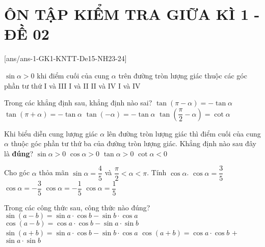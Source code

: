 \section*{ÔN TẬP KIỂM TRA GIỮA KÌ 1 - ĐỀ 02}
\setcounter{ex}{0}\setcounter{bt}{0}
[ans/ans-1-GK1-KNTT-De15-NH23-24]

\begin{ex}%
	$\sin\alpha>0$ khi điểm cuối của cung $\alpha$ trên đường tròn lượng giác thuộc các góc phần tư thứ
	\choice
	{I và III}
	{\True I và II}
	{II và IV}
	{I và IV}
\end{ex}
	\begin{ex}%
	Trong các khẳng định sau, khẳng định nào sai?
	\choice
	{$\tan\left(\pi-\alpha\right)=-\tan\alpha$}
	{\True $\tan\left(\pi+\alpha\right)=-\tan\alpha$}
	{$\tan\left(-\alpha\right)=-\tan\alpha$}
	{$\tan\left(\dfrac{\pi}{2}-\alpha\right)=\cot\alpha$}
\end{ex}
	\begin{ex}%
	Khi biểu diễn cung lượng giác $\alpha$ lên đường tròn lượng giác thì điểm cuối của cung $\alpha$ thuộc góc phần tư thứ ba của đường tròn lượng giác. Khẳng định nào sau đây là \textbf{đúng}?
	\choice
	{$\sin\alpha>0$}
	{$\cos\alpha>0$}
	{\True $\tan\alpha>0$}
	{$\cot\alpha<0$}
\end{ex}
\begin{ex}%
	Cho góc $\alpha$ thỏa mãn $\sin\alpha=\dfrac{4}{5}$ và $\dfrac{\pi}{2}<\alpha<\pi$. Tính $\cos\alpha$.
	\choice
	{$\cos\alpha=\dfrac{3}{5}$}
	{\True $\cos\alpha=-\dfrac{3}{5}$}
	{$\cos\alpha=-\dfrac{1}{5}$}
	{$\cos\alpha=\dfrac{1}{5}$}
\end{ex}
\begin{ex}%
	Trong các công thức sau, công thức nào đúng?
	\choice
	{\True $\sin\left(a-b\right)=\sin a\cdot\cos b-\sin b\cdot\cos a$}
	{$\cos\left(a-b\right)=\cos a\cdot\cos b-\sin a\cdot\sin b$}
	{$\sin\left(a+b\right)=\sin a\cdot\cos b-\sin b\cdot\cos a$}
	{$\cos\left(a+b\right)=\cos a\cdot\cos b$ $+$ $\sin a\cdot\sin b$}
\end{ex}
